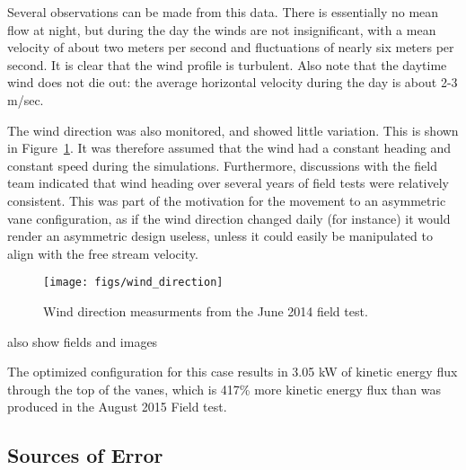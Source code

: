 Several observations can be made from this data. There is essentially no
mean flow at night, but during the day the winds are not insignificant,
with a mean velocity of about two meters per second and fluctuations of
nearly six meters per second. It is clear that the wind profile is
turbulent.  Also note that the daytime wind does not die out: the
average horizontal velocity during the day is about 2-3 m/sec. 

The wind direction was also monitored, and showed little variation. 
This is shown in Figure~\ref{fig:wind_direction}. It was therefore
assumed that the wind had a constant heading and constant speed during
the simulations. Furthermore, discussions with the field team indicated
that wind heading over several years of field tests were relatively
consistent. This was part of the motivation for the movement to an
asymmetric vane configuration, as if the wind direction changed daily
(for instance) it would render an asymmetric design useless, unless it
could easily be manipulated to align with the free stream velocity. 

 \begin{figure}[!htb]
  \begin{center}
   \texttt{[image: figs/wind\_direction]}
   \caption{Wind direction measurments from the June 2014 field test.}
   \label{fig:wind_direction}
  \end{center}
 \end{figure}




also show fields and images

The optimized configuration for this case results in 3.05 kW of kinetic
energy flux through the top of the vanes, which is 417\% more kinetic
energy flux than was produced in the August 2015 Field test.


\subsection{Sources of Error}
\label{sec:field_error}
%

